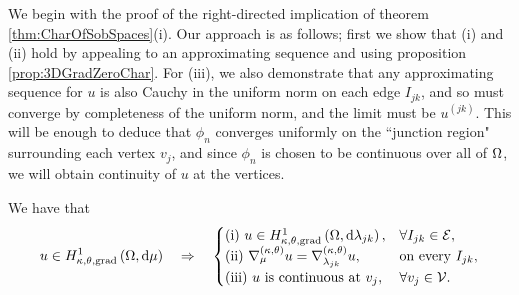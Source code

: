 We begin with the proof of the right-directed implication of theorem \ref{thm:CharOfSobSpaces}(i).
Our approach is as follows; first we show that (i) and (ii) hold by appealing to an approximating sequence and using proposition \ref{prop:3DGradZeroChar}.
For (iii), we also demonstrate that any approximating sequence for $u$ is also Cauchy in the uniform norm on each edge $I_{jk}$, and so must converge by completeness of the uniform norm, and the limit must be $u^{(jk)}$.
This will be enough to deduce that $\phi_n$ converges uniformly on the ``junction region" surrounding each vertex $v_j$, and since $\phi_n$ is chosen to be continuous over all of $\Omega$, we will obtain continuity of $u$ at the vertices.
\begin{theorem} \label{thm:3DTangGradGraph}
	We have that
	\begin{align*}
		u\in H^1_{\kappa,\theta,\mathrm{grad}}\left( \Omega, \mathrm{d}\mu \right) \quad\Rightarrow\quad
		\begin{cases}
			\mathrm{(i)} \ u\in H^1_{\kappa,\theta,\mathrm{grad}}\left( \Omega, \mathrm{d}\lambda_{jk} \right), & \forall I_{jk}\in\mathcal{E}, \\
			\mathrm{(ii)} \ \nabla^{\left( \kappa, \theta \right)}_{\mu}u = \nabla^{\left( \kappa, \theta \right)}_{\lambda_{jk}}u, & \text{on every } I_{jk}, \\
			\mathrm{(iii)} \ u \text{ is continuous at } v_j, & \forall v_j\in\mathcal{V}.
		\end{cases}
	\end{align*}
\end{theorem}
